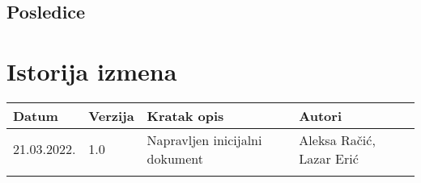 \documentclass[12pt]{article}
\begin{document}
\subsection{Posledice}

\section{Istorija izmena}
\begin{center}
\begin{tabular}{ | m{2cm} | m{1.5cm}| m{6cm} | m{5cm} | } 
\hline
Datum & Verzija & Kratak opis & Autori \\ 
\hline
 21.03.2022. & 1.0 & Napravljen inicijalni dokument & Aleksa Račić, Lazar Erić\\ 
\hline
&&&\\ 
\hline
\end{tabular}
\end{center}
\end{document}

